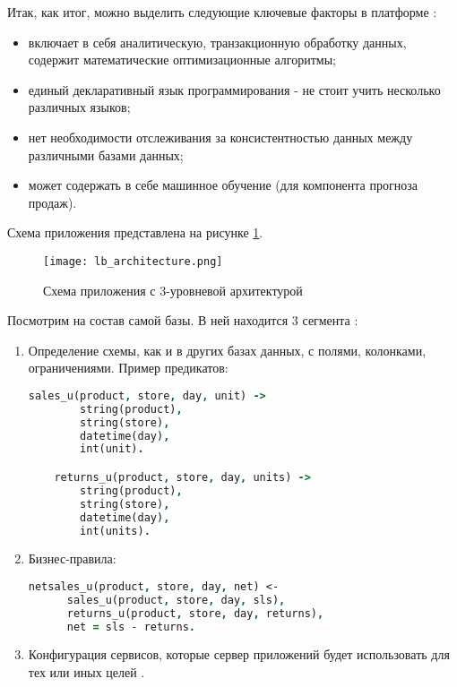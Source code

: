 Итак, как итог, можно выделить следующие ключевые факторы в платформе \LB:

\begin{itemize}
	\item включает в себя аналитическую, транзакционную обработку данных, содержит математические оптимизационные алгоритмы;
	\item единый декларативный язык программирования \logiql - не стоит учить несколько различных языков;
	\item нет необходимости отслеживания за консистентностью данных между различными базами данных;
	\item может содержать в себе машинное обучение (для компонента прогноза продаж).
\end{itemize}

Схема приложения \LB представлена на рисунке \ref{fig:technology:logicblox:lb_architecture}.

\begin{figure}
	\centering
	\texttt{[image: lb\_architecture.png]}
	\caption{Схема приложения \LB с 3-уровневой архитектурой \cite{lb_platform}}
	\label{fig:technology:logicblox:lb_architecture}
\end{figure}

Посмотрим на состав самой базы. В ней находится 3 сегмента \cite{lb_db_overview}:

\begin{enumerate}
	\item Определение схемы, как и в других базах данных, с полями, колонками, ограничениями. Пример предикатов:
	\begin{lstlisting}[language=Prolog]
	sales_u(product, store, day, unit) ->
		string(product),
		string(store),
		datetime(day),
		int(unit).

	returns_u(product, store, day, units) ->
		string(product),
		string(store),
		datetime(day),
		int(units).
	\end{lstlisting}
	\item Бизнес-правила:
	\begin{lstlisting}[language=Prolog]
	netsales_u(product, store, day, net) <-
	  sales_u(product, store, day, sls),
	  returns_u(product, store, day, returns),
	  net = sls - returns.
	\end{lstlisting}
	\item Конфигурация сервисов, которые сервер приложений будет использовать для тех или иных целей \cite{query_language_for_smart_db}.
\end{enumerate}
